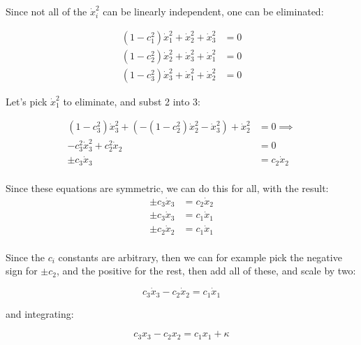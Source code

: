 \documentclass{article}
\newcommand{\xdot}[0]{\dot{x}}
\begin{document}
Since not all of the $\xdot_i^2$ can be linearly independent, one can be eliminated:

\begin{align*}
(1 - c_1^2) \xdot_1^2 + \xdot_2^2 + \xdot_3^2 &= 0 \\
(1 - c_2^2) \xdot_2^2 + \xdot_3^2 + \xdot_1^2 &= 0 \\
(1 - c_3^2) \xdot_3^2 + \xdot_1^2 + \xdot_2^2 &= 0
\end{align*}

Let's pick $\xdot_1^2$ to eliminate, and subst 2 into 3:

\begin{align*}
(1 - c_3^2) \xdot_3^2 + (-(1 - c_2^2) \xdot_2^2 - \xdot_3^2) + \xdot_2^2 &= 0
\implies \\
- c_3^2 \xdot_3^2 + c_2^2 \xdot_2 &= 0 \\
\pm c_3 \xdot_3 &= c_2 \xdot_2 \\
\end{align*}

%

Since these equations are symmetric, we can do this for all, with the result:
\begin{align*}
\pm c_3 \xdot_3 &= c_2 \xdot_2 \\
\pm c_3 \xdot_3 &= c_1 \xdot_1 \\
\pm c_2 \xdot_2 &= c_1 \xdot_1 \\
\end{align*}

Since the $c_i$ constants are arbitrary, then we can for example pick the negative sign for $\pm c_2$, and the positive for the rest, then add all of these, and scale by two:

\begin{equation*}
c_3 \xdot_3 - c_2 \xdot_2 = c_1 \xdot_1
\end{equation*}

and integrating:

\begin{equation*}
c_3 x_3 - c_2 x_2 = c_1 x_1 + \kappa
\end{equation*}
\end{document}
